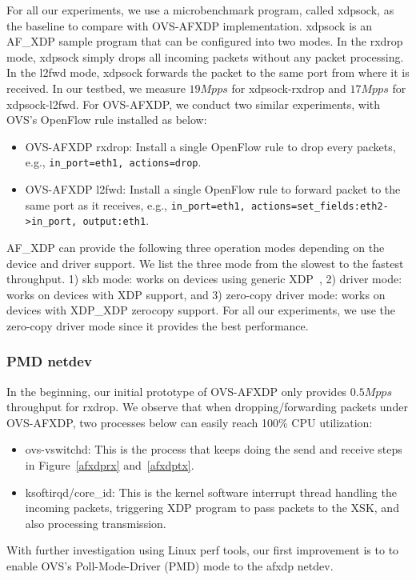 \documentclass[10pt]{sigplanconf}
\newcommand{\mycomment}[1]{}
\begin{document}
For all our experiments, we use a microbenchmark program, called xdpsock,
as the baseline to compare with OVS-AFXDP implementation.
xdpsock is an AF\_XDP sample program that can be configured into two modes.
In the rxdrop mode, xdpsock simply drops all incoming packets without any
packet processing. In the l2fwd mode, xdpsock forwards the packet to the
same port from where it is received.
In our testbed, we measure $19Mpps$ for xdpsock-rxdrop and $17Mpps$ for xdpsock-l2fwd.
For OVS-AFXDP, we conduct two similar experiments, with OVS's OpenFlow rule installed as
below:
\begin{itemize}
\item OVS-AFXDP rxdrop: Install a single OpenFlow rule to drop every packets,
e.g.,  \texttt{in\_port=eth1, actions=drop}.
\item OVS-AFXDP l2fwd: Install a single OpenFlow rule to forward packet to the same port
as it receives, e.g., \texttt{in\_port=eth1, actions=set\_fields:eth2->in\_port, output:eth1}.
\end{itemize}

AF\_XDP can provide the following three operation modes depending on the device
and driver support. We list the three mode from the slowest to the fastest
throughput.
1) skb mode: works on devices using generic XDP~\cite{genericxdp},
2) driver mode: works on devices with XDP support, and
3) zero-copy driver mode: works on devices with XDP\_XDP zerocopy support.
For all our experiments, we use the zero-copy driver mode since it provides the
best performance.

\subsubsection{PMD netdev}
In the beginning, our initial prototype of OVS-AFXDP only provides $0.5Mpps$
throughput for rxdrop.
We observe that when dropping/forwarding packets under OVS-AFXDP, two processes
below can easily reach 100\% CPU utilization:
\begin{itemize}
\item ovs-vswitchd: This is the process that keeps doing the send and receive steps
in Figure~\ref{afxdprx} and~\ref{afxdptx}.
\item ksoftirqd/core\_id: This is the kernel software interrupt thread handling the
incoming packets, triggering XDP program to pass packets to the XSK, and also
processing transmission.
\end{itemize}
\mycomment{Compared to xdpsock, ovs-vswitchd adds on top of it a umempool,
and packets parsing, lookup and action execution.}
With further investigation using Linux perf tools, our first improvement is to
to enable OVS's Poll-Mode-Driver (PMD) mode to the afxdp netdev.
\end{document}
